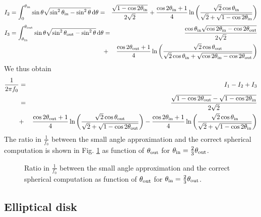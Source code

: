 \documentclass{article}[12pt,a4]
\begin{document}
\begin{eqnarray}
I_2 = \int_0^{\theta_{\rm in}} \sin \theta \sqrt {\sin^2 \theta_{\rm in} - \sin^2 \theta} \, {\rm d}\theta & = 
&\frac{\sqrt{1 - \cos 2\theta_{\rm in}}}{2 \sqrt{2}} + 
\frac{\cos 2\theta_{\rm in}+1}{4} \ln 
\left( 
\frac{\sqrt{2} \cos \theta_{\rm in}}{\sqrt{2} + \sqrt{1 - \cos 2\theta_{\rm in}}} 
\right)
\end{eqnarray}
\begin{eqnarray}
I_3 = \int_{\theta_{\rm in}}^{\theta_{\rm out}} \sin \theta \sqrt {\sin^2 \theta_{\rm out} - \sin^2 \theta} \, {\rm d}\theta & = &
\frac{\cos \theta_{\rm in} \sqrt{\cos 2\theta_{\rm in} - \cos 2\theta_{\rm out}}}{2 \sqrt{2}} \nonumber \\
& + &\frac{\cos 2\theta_{\rm out}+1}{4}
\ln \left( 
\frac{\sqrt{2} \cos \theta_{\rm out}}
{ \sqrt{2} \cos \theta_{\rm in} + \sqrt{\cos 2\theta_{\rm in} - \cos 2\theta_{\rm out}} }
\right)
\end{eqnarray}
We thus obtain
\begin{eqnarray}
\frac{1}{2\pi f_0} & = & I_1 - I_2 + I_3 \nonumber \\
& = & \frac{ \sqrt{1 - \cos 2\theta_{\rm out}} - \sqrt{1 - \cos 2\theta_{\rm in}} }{ 2 \sqrt{2} } \nonumber \\
& + & \frac{\cos 2\theta_{\rm out}+1}{4} \ln \left( 
\frac{\sqrt{2} \cos \theta_{\rm out}} {\sqrt{2} + \sqrt{1 - \cos 2\theta_{\rm out}}} \right) -
\frac{\cos 2\theta_{\rm in}+1}{4} \ln \left( 
\frac{\sqrt{2} \cos \theta_{\rm in}}{\sqrt{2} + \sqrt{1 - \cos 2\theta_{\rm in}}} \right)
\end{eqnarray}
The ratio in $\frac{1}{f_0}$ between the small angle approximation and the correct spherical
computation is shown in Fig. \ref{fig:shellfunction} as function of $\theta_{\rm out}$ for
$\theta_{\rm in} = \frac{2}{3}\theta_{\rm out}$.

\begin{figure}
  \center
 \caption{Ratio in $\frac{1}{f_0}$ between the small angle approximation and the correct 
spherical computation as function of $\theta_{\rm out}$ for
$\theta_{\rm in} = \frac{2}{3}\theta_{\rm out}$.}
 \label{fig:shellfunction}
\end{figure}


\subsection{Elliptical disk}
\end{document}
